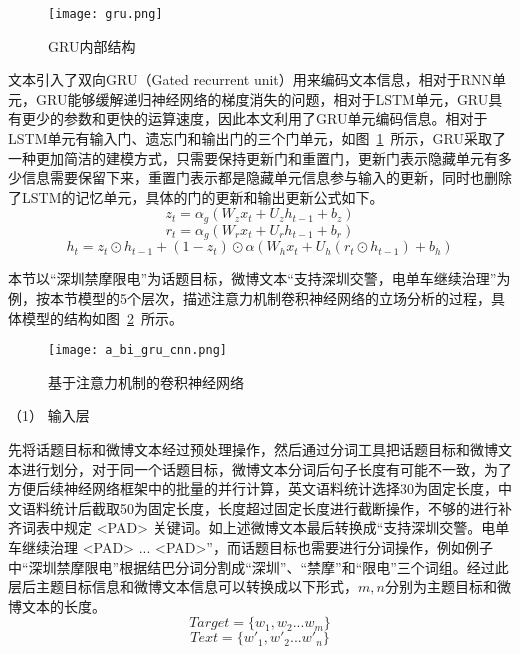 \begin{figure}[htbp]
	\centering
	\texttt{[image: gru.png]}
	\caption[rnn_vanish]{GRU内部结构}
	\label{gru}
\end{figure}
文本引入了双向GRU（Gated recurrent unit）用来编码文本信息，相对于RNN单元，GRU能够缓解递归神经网络的梯度消失的问题，相对于LSTM单元，GRU具有更少的参数和更快的运算速度，因此本文利用了GRU单元编码信息。相对于LSTM单元有输入门、遗忘门和输出门的三个门单元，如图~\ref{gru}~所示，GRU采取了一种更加简洁的建模方式，只需要保持更新门和重置门，更新门表示隐藏单元有多少信息需要保留下来，重置门表示都是隐藏单元信息参与输入的更新，同时也删除了LSTM的记忆单元，具体的门的更新和输出更新公式如下。
\begin{equation}\label{conv1} z_t=\alpha_g(W_zx_t+U_zh_{t-1}+b_z) \end{equation}
\begin{equation}\label{conv1} r_t=\alpha_g(W_rx_t+U_rh_{t-1}+b_r) \end{equation}
\begin{equation}\label{conv1} h_t=z_t\odot h_{t-1} + (1-z_t)\odot \alpha(W_hx_t+U_h(r_t\odot h_{t-1})+b_h) \end{equation}

本节以“深圳禁摩限电”为话题目标，微博文本“支持深圳交警，电单车继续治理”为例，按本节模型的5个层次，描述注意力机制卷积神经网络的立场分析的过程，具体模型的结构如图~\ref{GRU_CNN}~所示。

\begin{figure}[htbp]
	\centering
	\texttt{[image: a\_bi\_gru\_cnn.png]}
	\caption[]{基于注意力机制的卷积神经网络}
	\label{GRU_CNN}
\end{figure}

（1） 输入层

先将话题目标和微博文本经过预处理操作，然后通过分词工具把话题目标和微博文本进行划分，对于同一个话题目标，微博文本分词后句子长度有可能不一致，为了方便后续神经网络框架中的批量的并行计算，英文语料统计选择30为固定长度，中文语料统计后截取50为固定长度，长度超过固定长度进行截断操作，不够的进行补齐词表中规定 <PAD> 关键词。如上述微博文本最后转换成“支持深圳交警。电单车继续治理 <PAD> ... <PAD>”，而话题目标也需要进行分词操作，例如例子中“深圳禁摩限电”根据结巴分词分割成“深圳”、“禁摩”和“限电”三个词组。经过此层后主题目标信息和微博文本信息可以转换成以下形式，$m,n$分别为主题目标和微博文本的长度。
\begin{equation}\label{target_info} Target= \lbrace w_1,w_2...w_m\rbrace \end{equation}
\begin{equation}\label{text_info} Text=\lbrace w'_1,w'_2...w'_n\rbrace  \end{equation}

